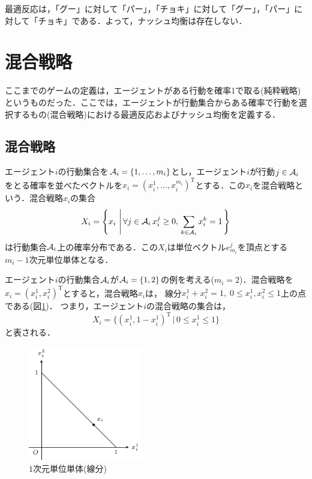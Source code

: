\documentclass{jsreport}
\begin{document}
最適反応は，「グー」に対して「パー」，「チョキ」に対して「グー」，「パー」に対して「チョキ」である．よって，ナッシュ均衡は存在しない．

\section{混合戦略}
ここまでのゲームの定義は，エージェントがある行動を確率1で取る(純粋戦略)というものだった．ここでは，エージェントが行動集合からある確率で行動を選択するもの(混合戦略)における最適反応およびナッシュ均衡を定義する．

\subsection{混合戦略}
エージェント$i$の行動集合を${\cal A}_i = \{1, \ldots, m_i\}$とし，エージェント$i$が行動$j \in {\cal A}_i$をとる確率を並べたベクトルを$x_i = (x_i^1, \ldots, x_i^{m_i})^{\mathrm{T}}$とする．この$x_i$を混合戦略という．混合戦略$x_i$の集合
\begin{equation}
  X_i = \left\{x_i \, \left| \, \forall j \in {\cal A}_i \, x_i^{j} \geq 0, \, \sum_{k \in {\cal A}_i} x_i^{k} = 1\right.\right\} \nonumber
\end{equation}
は行動集合${\cal A}_i$上の確率分布である．この$X_i$は単位ベクトル$e_{m_i}^j$を頂点とする$m_i - 1$次元単位単体となる．

エージェント$i$の行動集合${\cal A}_i$が${\cal A}_i = \{1, 2\}$の例を考える($m_i = 2$)．混合戦略を$x_i = (x_i^1, x_i^2)^{\mathrm{T}}$とすると，混合戦略$x_i$は，
線分$x_i^1 + x_i^2 = 1, \; 0 \leq x_i^1, x_i^2 \leq 1$上の点である(図\ref{fig:mixed})．
つまり，エージェント$i$の混合戦略の集合は，
\begin{equation}
  X_i = \{(x_i^1, 1 - x_i^1)^{\mathrm{T}} \, | \, 0 \leq x_i^1 \leq 1\} \nonumber
\end{equation}
と表される．
\begin{figure}[htb]
  \centering
  \includegraphics[clip, width=5cm]{./fig/graph_1.pdf}
  \caption{$1$次元単位単体(線分)}
  \label{fig:mixed}
\end{figure}
\end{document}
